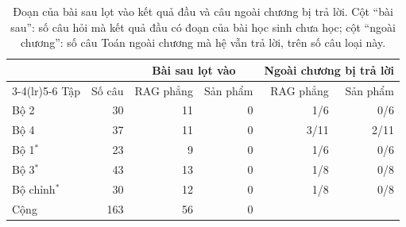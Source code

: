 \begin{table}[H]
\centering
\caption{Đoạn của bài sau lọt vào kết quả đầu và câu ngoài chương bị trả lời. Cột ``bài sau'': số câu hỏi mà kết quả đầu có đoạn của bài học sinh chưa học; cột ``ngoài chương'': số câu Toán ngoài chương mà hệ vẫn trả lời, trên số câu loại này.}\label{tab:rag-flat}
\small
\begin{tabular}{lrrrrr}
\toprule
 & & \multicolumn{2}{c}{Bài sau lọt vào} & \multicolumn{2}{c}{Ngoài chương bị trả lời} \\
\cmidrule(lr){3-4}\cmidrule(lr){5-6}
Tập & Số câu & RAG phẳng & Sản phẩm & RAG phẳng & Sản phẩm \\
\midrule
Bộ 2 & 30 & 11 & 0 & 1/6 & 0/6 \\
Bộ 4 & 37 & 11 & 0 & 3/11 & 2/11 \\
Bộ 1$^{*}$ & 23 & 9 & 0 & 1/6 & 0/6 \\
Bộ 3$^{*}$ & 43 & 13 & 0 & 1/8 & 0/8 \\
Bộ chỉnh$^{*}$ & 30 & 12 & 0 & 1/8 & 0/8 \\
\midrule
Cộng & 163 & 56 & 0 & & \\
\bottomrule
\end{tabular}
\end{table}
